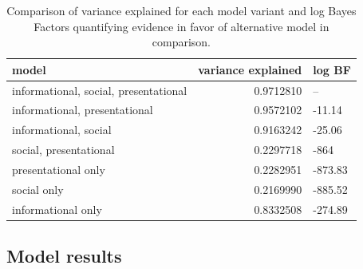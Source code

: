 \documentclass[oneside]{report}
\begin{document}
\begin{table}[t]

\caption[Comparison of model variants using variance explained and log Bayes Factors.]{\label{tab:comparisonTable}Comparison of variance explained for each model variant and log Bayes Factors quantifying evidence in favor of alternative model in comparison.}
\centering
\begin{tabular}{lrl}
\toprule
model & variance 
\textbf{explained} & \textbf{log BF}\\
\midrule
informational, 
social, 
presentational & 0.9712810 & --\\
informational, 
presentational & 0.9572102 & -11.14\\
informational, 
social & 0.9163242 & -25.06\\
social, 
presentational & 0.2297718 & -864\\
presentational 
only & 0.2282951 & -873.83\\
\addlinespace
social only & 0.2169990 & -885.52\\
informational 
only & 0.8332508 & -274.89\\
\bottomrule
\end{tabular}
\end{table}
\subsection{Model results}\label{model-results}
\end{document}
